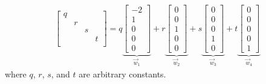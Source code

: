 \documentclass[letterpaper,12pt]{article}
\begin{document}
\begin{enumerate}
\begin{align*}
\begin{bmatrix}
        q \\
        & r \\
        & & s \\
        & & & t \\
      \end{bmatrix} =
      q\underbrace{\begin{bmatrix}
        -2 \\ 1 \\ 0 \\ 0 \\ 0
      \end{bmatrix}}_{\vec{w}_1} + r\underbrace{\begin{bmatrix}
        0 \\ 0 \\ 1 \\ 0 \\ 0
      \end{bmatrix}}_{\vec{w}_2} + s\underbrace{\begin{bmatrix}
        0 \\ 0 \\ 0 \\ 1 \\ 0
      \end{bmatrix}}_{\vec{w}_3} + t\underbrace{\begin{bmatrix}
        0 \\ 0 \\ 0 \\ 0 \\ 1
      \end{bmatrix}}_{\vec{w}_4}
    \end{align*}
    where $q$, $r$, $s$, and $t$ are arbitrary constants.


\end{enumerate}
\end{document}
